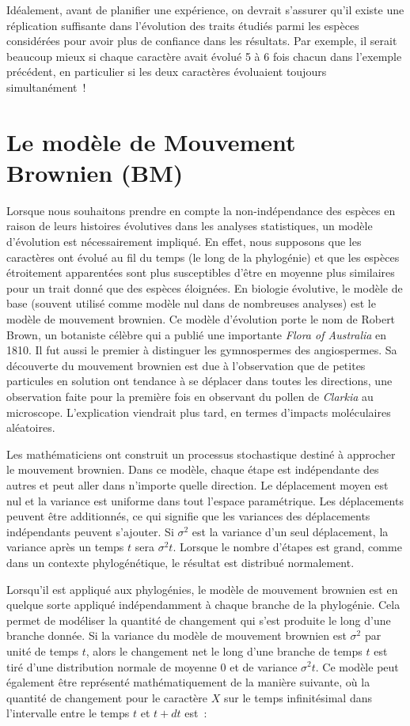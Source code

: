 \documentclass[
]{book}
\begin{document}
Idéalement, avant de planifier une expérience, on devrait s'assurer qu'il existe une réplication suffisante dans l'évolution des traits étudiés parmi les espèces considérées pour avoir plus de confiance dans les résultats. Par exemple, il serait beaucoup mieux si chaque caractère avait évolué 5 à 6 fois chacun dans l'exemple précédent, en particulier si les deux caractères évoluaient toujours simultanément~!

\chapter{Le modèle de Mouvement Brownien (BM)}\label{BM-model}

Lorsque nous souhaitons prendre en compte la non-indépendance des espèces en raison de leurs histoires évolutives dans les analyses statistiques, un modèle d'évolution est nécessairement impliqué. En effet, nous supposons que les caractères ont évolué au fil du temps (le long de la phylogénie) et que les espèces étroitement apparentées sont plus susceptibles d'être en moyenne plus similaires pour un trait donné que des espèces éloignées. En biologie évolutive, le modèle de base (souvent utilisé comme modèle nul dans de nombreuses analyses) est le modèle de mouvement brownien. Ce modèle d'évolution porte le nom de Robert Brown, un botaniste célèbre qui a publié une importante \emph{Flora of Australia} en 1810. Il fut aussi le premier à distinguer les gymnospermes des angiospermes. Sa découverte du mouvement brownien est due à l'observation que de petites particules en solution ont tendance à se déplacer dans toutes les directions, une observation faite pour la première fois en observant du pollen de \emph{Clarkia} au microscope. L'explication viendrait plus tard, en termes d'impacts moléculaires aléatoires.

Les mathématiciens ont construit un processus stochastique destiné à approcher le mouvement brownien. Dans ce modèle, chaque étape est indépendante des autres et peut aller dans n'importe quelle direction. Le déplacement moyen est nul et la variance est uniforme dans tout l'espace paramétrique. Les déplacements peuvent être additionnés, ce qui signifie que les variances des déplacements indépendants peuvent s'ajouter. Si \(\sigma^2\) est la variance d'un seul déplacement, la variance après un temps \(t\) sera \(\sigma^2t\). Lorsque le nombre d'étapes est grand, comme dans un contexte phylogénétique, le résultat est distribué normalement.

Lorsqu'il est appliqué aux phylogénies, le modèle de mouvement brownien est en quelque sorte appliqué indépendamment à chaque branche de la phylogénie. Cela permet de modéliser la quantité de changement qui s'est produite le long d'une branche donnée. Si la variance du modèle de mouvement brownien est \(\sigma^2\) par unité de temps \(t\), alors le changement net le long d'une branche de temps \(t\) est tiré d'une distribution normale de moyenne \(0\) et de variance \(\sigma^2t\). Ce modèle peut également être représenté mathématiquement de la manière suivante, où la quantité de changement pour le caractère \(X\) sur le temps infinitésimal dans l'intervalle entre le temps \(t\) et \(t+dt\) est~:
\end{document}
